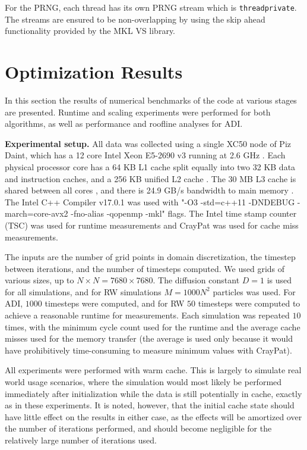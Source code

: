 \documentclass[letterpaper]{article}
\newcommand{\mypar}[1]{{\bf #1.}}
\begin{document}
For the PRNG, each thread has its own  PRNG stream which is {\tt threadprivate}. The streams are ensured to be non-overlapping by using the skip ahead functionality provided by the MKL VS library.


\section{Optimization Results}\label{sec:results}

In this section the results of numerical benchmarks of the code at various stages are presented. Runtime and scaling experiments were performed for both algorithms, as well as performance and roofline analyses for ADI.

\mypar{Experimental setup}
All data was collected using a single XC50 node of Piz Daint, which has a 12 core Intel Xeon E5-2690 v3 running at 2.6 GHz \cite{daint}. Each physical processor core has a 64 KB L1 cache split equally into two 32 KB data and instruction caches, and a 256 KB unified L2 cache \cite{cpu_world}. The 30 MB L3 cache is shared between all cores \cite{ark_intel}, and there is 24.9 GB/s bandwidth to main memory \cite{7_cpu}. The Intel C++ Compiler v17.0.1 was used with "-O3 -std=c++11 -DNDEBUG -march=core-avx2 -fno-alias -qopenmp -mkl" flags. The Intel time stamp counter (TSC) was used for runtime measurements and CrayPat was used for cache miss measurements.

The inputs are the number of grid points in domain discretization, the timestep between iterations, and the number of timesteps computed. We used grids of various sizes, up to $N\times N=7680\times7680$. The diffusion constant $D=1$ is used for all simulations, and for RW simulations $M=1000N^2$ particles was used. For ADI, $1000$ timesteps were computed, and for RW $50$ timesteps were computed to achieve a reasonable runtime for measurements. Each simulation was repeated $10$ times, with the minimum cycle count used for the runtime and the average cache misses used for the memory transfer (the average is used only because it would have prohibitively time-consuming to measure minimum values with CrayPat).

All experiments were performed with warm cache. This is largely to simulate real world usage scenarios, where the simulation would most likely be performed immediately after initialization while the data is still potentially in cache, exactly as in these experiments. It is noted, however, that the initial cache state should have little effect on the results in either case, as the effects will be amortized over the number of iterations performed, and should become negligible for the relatively large number of iterations used.
\end{document}
